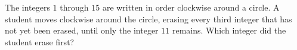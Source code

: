 The integers $1$ through $15$ are written in order clockwise around a circle. A student moves clockwise around the circle, erasing every third integer that has not yet been erased, until only the integer $11$ remains. Which integer did the student erase first?
